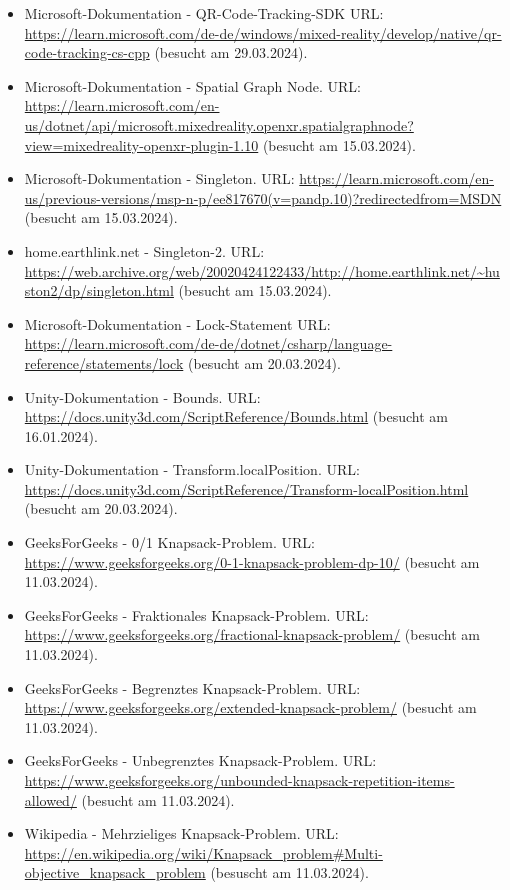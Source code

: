 \begin{itemize}[leftmargin=0pt]
    \item Microsoft-Dokumentation - QR-Code-Tracking-SDK {\scriptsize URL:} \url{https://learn.microsoft.com/de-de/windows/mixed-reality/develop/native/qr-code-tracking-cs-cpp} (besucht am 29.03.2024).
    \item Microsoft-Dokumentation - Spatial Graph Node. {\scriptsize URL:} \url{https://learn.microsoft.com/en-us/dotnet/api/microsoft.mixedreality.openxr.spatialgraphnode?view=mixedreality-openxr-plugin-1.10} (besucht am 15.03.2024).
    \item Microsoft-Dokumentation - Singleton. {\scriptsize URL:} \url{https://learn.microsoft.com/en-us/previous-versions/msp-n-p/ee817670(v=pandp.10)?redirectedfrom=MSDN} (besucht am 15.03.2024).
    \item home.earthlink.net - Singleton-2. {\scriptsize URL:} \url{https://web.archive.org/web/20020424122433/http://home.earthlink.net/~huston2/dp/singleton.html} (besucht am 15.03.2024).
    \item Microsoft-Dokumentation - Lock-Statement {\scriptsize URL:} \url{https://learn.microsoft.com/de-de/dotnet/csharp/language-reference/statements/lock} (besucht am 20.03.2024).
    \item Unity-Dokumentation - Bounds. {\scriptsize URL:} \url{https://docs.unity3d.com/ScriptReference/Bounds.html} (besucht am 16.01.2024).
    \item Unity-Dokumentation - Transform.localPosition. {\scriptsize URL:} \url{https://docs.unity3d.com/ScriptReference/Transform-localPosition.html} (besucht am 20.03.2024).
    \item GeeksForGeeks - 0/1 Knapsack-Problem. {\scriptsize URL:} \url{https://www.geeksforgeeks.org/0-1-knapsack-problem-dp-10/} (besucht am 11.03.2024).
    \item GeeksForGeeks - Fraktionales Knapsack-Problem. {\scriptsize URL:} \url{https://www.geeksforgeeks.org/fractional-knapsack-problem/} (besucht am 11.03.2024).
    \item GeeksForGeeks - Begrenztes Knapsack-Problem. {\scriptsize URL:} \url{https://www.geeksforgeeks.org/extended-knapsack-problem/} (besucht am 11.03.2024).
    \item GeeksForGeeks - Unbegrenztes Knapsack-Problem. {\scriptsize URL:} \url{https://www.geeksforgeeks.org/unbounded-knapsack-repetition-items-allowed/} (besucht am 11.03.2024).
    \item Wikipedia - Mehrzieliges Knapsack-Problem. {\scriptsize URL:} \url{https://en.wikipedia.org/wiki/Knapsack_problem#Multi-objective_knapsack_problem} (besuscht am 11.03.2024).

\end{itemize}
